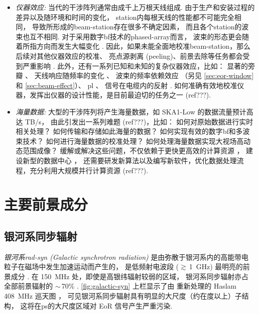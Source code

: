 \begin{itemize}
\item
\emph{仪器效应:}
当代的干涉阵列通常由成千上万根天线组成. 由于生产和安装过程的差异以及随环境和时间的变化，
\ac{station}内每根天线的性能都不可能完全相同，
导致所形成的\ac{beam-station}存在很多不确定因素，
而且各个\ac{station}的波束也互不相同.
对于采用数字\ac{bf}技术的\ac{phased-array}而言，
波束的形态更会随着所指方向而发生大幅变化
\cite{smirnov2011iii,vanWeeren2016,jagannathan2017}.
因此，如果未能全面地校准\ac{beam-station}，那么后续对其他仪器效应的校准、
亮点源剥离 (peeling)、前景去除等任务都会受到严重影响 \cite{noordam2004,neben2016}.
此外，还有一系列已知和未知的复杂仪器效应，比如：
显著的旁瓣 \cite{thyagarajan2015,mort2017}、
天线响应随频率的变化 \cite{bernardi2015,trott2017}、
波束的频率依赖效应 \cite{liu2009ps,datta2010,morales2012}
（另见 \autoref{sec:eor-window} 和 \autoref{sec:beam-effect}）、
\ac{pl} \cite{asad2015,asad2016,asad2018,lenc2017}、
信号在电缆内的反射 \cite{beardsley2016}.
如何准确有效地校准仪器，发挥出仪器的设计性能，是目前最迫切的任务之一
\cite{noordam2004,wijnholds2010} (ref???).

\item
\emph{海量数据:}
大型的干涉阵列将产生海量数据，如 SKA1-Low 的数据流量预计高达 TB/s，
由此引发出一系列难题 \cite{norris2011} (ref???)，比如：
如何对原始数据进行实时相关处理？
如何传输和存储如此海量的数据？
如何实现有效的数字\ac{bf}和多波束技术？
如何进行海量数据的校准处理？
如何处理海量数据实现大视场高动态范围成像？
缓解或解决这些问题，不仅依赖于更快更高效的计算资源 \cite{magro2014,vermij2017}，
建设新型的数据中心 \cite{chrysostomou2018}，
还需要研发新算法以及编写新软件，优化数据处理流程，充分利用大规模并行计算资源
\cite{morales2009,gunst2018} (ref???).

\end{itemize}


\section{主要前景成分}
\label{sec:fg-intro}

\subsection{银河系同步辐射}

\emph{银河系\acs{rad-syn} (Galactic synchrotron radiation)}
是由弥散于银河系内的高能带电粒子在磁场中发生加速运动而产生的，
是低频射电波段 ($\gtrsim$\,\SI{1}{\GHz}) 最明亮的前景成分
\cite{bernardi2009,ghosh2012}.
在 \SI{150}{\MHz} 处，即使是高银纬辐射较弱的区域，
银河系同步辐射亦占全部前景辐射的 $\sim$\,70\% \cite{shaver1999}.
\autoref{fig:galactic-syn} 上栏显示了由 
重新处理的 Haslam \SI{408}{\MHz} 巡天图 \cite{haslam1982}，
可见银河系同步辐射具有明显的大尺度（约在度以上）子结构，
这将在\ac{ps}的大尺度区域对 EoR 信号产生严重污染.

